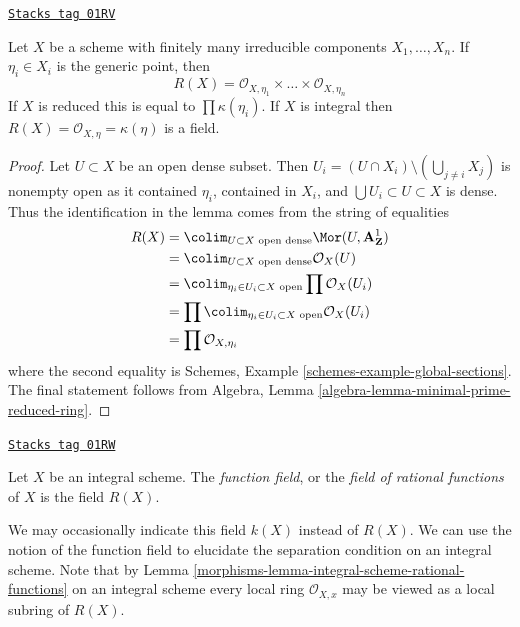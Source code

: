 \begin{lemma}
\label{morphisms-lemma-integral-scheme-rational-functions}
\href{https://stacks.math.columbia.edu/tag/01RV}{\texttt{Stacks tag 01RV}}

Let $X$ be a scheme with finitely many irreducible components
$X_1, \ldots, X_n$. If $\eta_i \in X_i$ is the generic point, then
$$
R(X) = \mathcal{O}_{X, \eta_1} \times \ldots \times \mathcal{O}_{X, \eta_n}
$$
If $X$ is reduced this is equal to $\prod \kappa(\eta_i)$.
If $X$ is integral then $R(X) = \mathcal{O}_{X, \eta} = \kappa(\eta)$
is a field.
\end{lemma}

\begin{proof}
Let $U \subset X$ be an open dense subset. Then
$U_i = (U \cap X_i) \setminus (\bigcup_{j \not = i} X_j)$
is nonempty open as it contained $\eta_i$, contained in $X_i$,
and $\bigcup U_i \subset U \subset X$ is dense.
Thus the identification in the lemma comes from the string of equalities
\begin{align*}
R(X)
& =
\colim_{U \subset X\text{ open dense}} \Mor(U, \mathbf{A}^1_\mathbf{Z}) \\
& =
\colim_{U \subset X\text{ open dense}} \mathcal{O}_X(U) \\
& =
\colim_{\eta_i \in U_i \subset X\text{ open}} \prod \mathcal{O}_X(U_i) \\
& =
\prod \colim_{\eta_i \in U_i \subset X\text{ open}} \mathcal{O}_X(U_i) \\
& =
\prod \mathcal{O}_{X, \eta_i}
\end{align*}
where the second equality is
Schemes, Example \ref{schemes-example-global-sections}.
The final statement follows from
Algebra, Lemma \ref{algebra-lemma-minimal-prime-reduced-ring}.
\end{proof}

\begin{definition}
\label{morphisms-definition-function-field}
\href{https://stacks.math.columbia.edu/tag/01RW}{\texttt{Stacks tag 01RW}}

Let $X$ be an integral scheme.
The {\it function field}, or the {\it field of rational functions}
of $X$ is the field $R(X)$.
\end{definition}

We may occasionally indicate this field $k(X)$ instead of $R(X)$.
We can use the notion of the function field to elucidate the
separation condition on an integral scheme.
Note that by Lemma \ref{morphisms-lemma-integral-scheme-rational-functions}
on an integral scheme every local ring $\mathcal{O}_{X, x}$ may be viewed
as a local subring of $R(X)$.

